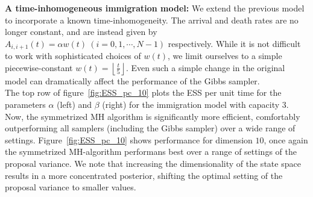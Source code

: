 {\textbf{A time-inhomogeneous immigration model:}
We extend the previous model to incorporate a known time-inhomogeneity. 
The arrival and death rates are no longer constant, and are instead given by
$A_{i, i+1}(t) = \alpha w(t) \ (i =0,1,\cdots,N-1)$ respectively.
While it is not difficult to work with sophisticated choices of $w(t)$,
we limit ourselves to a simple piecewise-constant 
$w(t) = \left\lfloor \frac{t}{5} \right\rfloor$. Even such a simple
change in the original model can dramatically affect the performance
of the Gibbs sampler. \\
 The top row of figure~\ref{fig:ESS_pc_10} plots the ESS per unit time for the 
 parameters $\alpha$ (left) and $\beta$ (right) for the immigration model with 
 capacity $3$.  Now, the symmetrized MH algorithm is significantly 
 more efficient, comfortably outperforming all samplers (including the Gibbs 
 sampler) over a wide range of settings. %
 Figure~\ref{fig:ESS_pc_10} shows performance for dimension
 $10$, once again the symmetrized MH-algorithm performans best over a 
 range of settings of the proposal variance. We note that increasing the
 dimensionality of the state space results in a more concentrated posterior,
 shifting the optimal setting of the proposal variance to smaller values.

}
